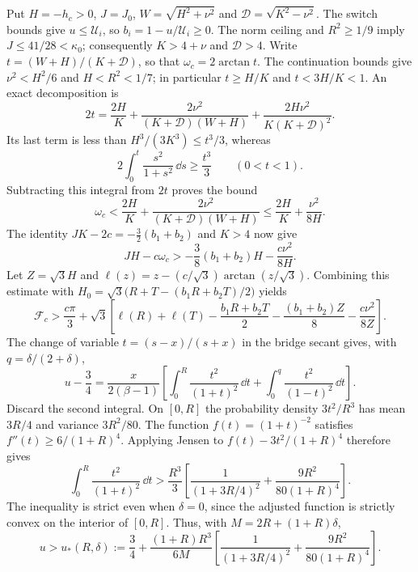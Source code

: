  Put $H=-h_c>0$, $J=J_0$, $W=\sqrt{H^2+\nu^2}$ and
$\mathcal D=\sqrt{K^2-\nu^2}$. The switch bounds give $u\le\mathcal U_i$, so
$b_i=1-u/\mathcal U_i\ge0$. The norm ceiling and $R^2\ge1/9$ imply
$J\le41/28<\kappa_0$; consequently $K>4+\nu$ and $\mathcal D>4$.
Write $t=(W+H)/(K+\mathcal D)$, so that $\omega_c=2\arctan t$.
The continuation bounds give $\nu^2<H^2/6$ and $H<R^2<1/7$; in particular
$t\ge H/K$ and $t<3H/K<1$. An exact decomposition is
\[
 2t=\frac{2H}{K}+\frac{2\nu^2}{(K+\mathcal D)(W+H)}
       +\frac{2H\nu^2}{K(K+\mathcal D)^2}.
\]
Its last term is less than $H^3/(3K^3)\le t^3/3$, whereas
\[
 2\int_0^t\frac{s^2}{1+s^2}\,\dd s\ge\frac{t^3}{3}
 \qquad(0<t<1).
\]
Subtracting this integral from $2t$ proves the bound
\[
 \omega_c<\frac{2H}{K}+\frac{2\nu^2}{(K+\mathcal D)(W+H)}
 \le\frac{2H}{K}+\frac{\nu^2}{8H}.
\]
The identity $JK-2c=-\frac32(b_1+b_2)$ and $K>4$ now give
\[
 JH-c\omega_c>
 -\frac38(b_1+b_2)H-\frac{c\nu^2}{8H}.
\]
Let $Z=\sqrt3H$ and $\ell(z)=z-(c/\sqrt3)\arctan(z/\sqrt3)$. Combining this estimate with
$H_0=\sqrt3\bigl(R+T-(b_1R+b_2T)/2\bigr)$ yields
\[
 \mathcal F_c>\frac{c\pi}{3}+\sqrt3\left[
 \ell(R)+\ell(T)-\frac{b_1R+b_2T}{2}
 -\frac{(b_1+b_2)Z}{8}-\frac{c\nu^2}{8Z}\right].
\]
 The change of variable $t=(s-x)/(s+x)$ in the bridge secant
gives, with $q=\delta/(2+\delta)$,
\[
 u-\frac34=\frac{x}{2(\beta-1)}
 \left[\int_0^R\frac{t^2}{(1+t)^2}\,\dd t+
       \int_0^q\frac{t^2}{(1-t)^2}\,\dd t\right].
\]
Discard the second integral. On $[0,R]$ the probability density $3t^2/R^3$ has mean $3R/4$
and variance $3R^2/80$. The function $f(t)=(1+t)^{-2}$ satisfies
$f''(t)\ge6/(1+R)^4$. Applying Jensen to
$f(t)-3t^2/(1+R)^4$ therefore gives
\[
 \int_0^R\frac{t^2}{(1+t)^2}\,\dd t>
 \frac{R^3}{3}\left[\frac1{(1+3R/4)^2}
                   +\frac{9R^2}{80(1+R)^4}\right].
\]
The inequality is strict even when $\delta=0$, since the adjusted function is strictly convex
on the interior of $[0,R]$. Thus, with $M=2R+(1+R)\delta$,
\begin{equation}\label{eq:ss-variance-floor}
 u>u_*(R,\delta):=\frac34+
 \frac{(1+R)R^3}{6M}
 \left[\frac1{(1+3R/4)^2}+\frac{9R^2}{80(1+R)^4}\right].
\end{equation}

